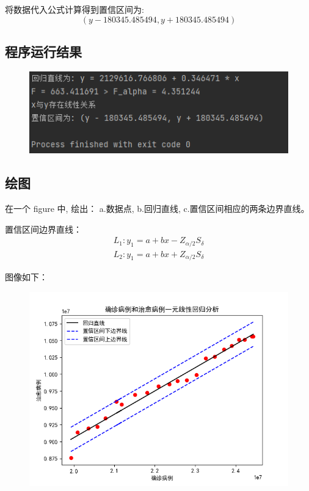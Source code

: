 \documentclass[UTF8]{ctexart}
\begin{document}
将数据代入公式计算得到置信区间为:
$$
(y - 180345.485494, y + 180345.485494)
$$

\subsection{程序运行结果}
\begin{figure}[H]
  \centering
  \includegraphics[scale=1.5]{result.png}
\end{figure}

\subsection{绘图}
在一个 figure 中, 绘出： a.数据点, b.回归直线, c.置信区间相应的两条边界直线。

置信区间边界直线：
$$
\begin{array}{l}
L_{1}: y_{1}=a+b x-Z_{\alpha / 2} S_{\delta} \\
L_{2}: y_{1}=a+b x+Z_{\alpha / 2} S_{\delta}
\end{array}
$$

图像如下：

\begin{figure}[H]
  \centering
  \includegraphics[scale=0.8]{回归分析.png}
\end{figure}
\end{document}
